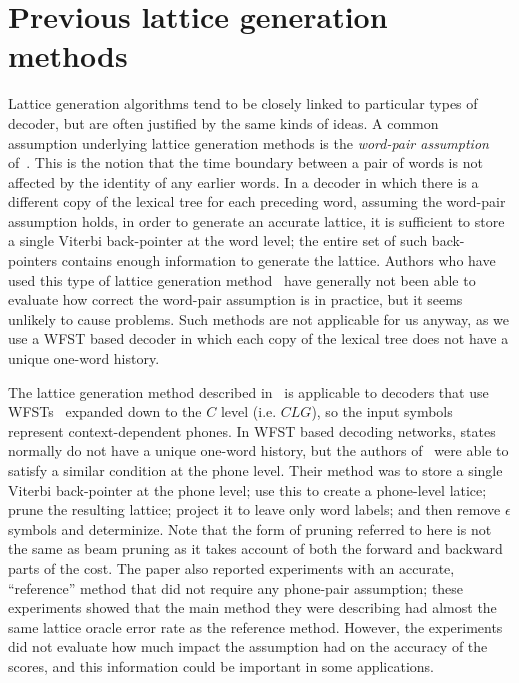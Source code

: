 \documentclass{article}
\begin{document}
\section{Previous lattice generation methods}
\label{sec:previous}

Lattice generation algorithms tend to be closely linked to particular types of decoder,
but are often justified by the same kinds of ideas.
A common assumption underlying lattice generation methods is the {\em word-pair assumption}
of~\cite{ney_word_graph}.  This is the notion that the time boundary between a pair of words
is not affected by the identity of any earlier words.  In a decoder in which there is
a different copy of the lexical tree for each preceding word, 
assuming the word-pair assumption holds, in order to generate an accurate lattice, it is
sufficient to store a single Viterbi back-pointer at the word level; the entire set of
such back-pointers contains enough information to generate the lattice.  Authors who have used
this type of lattice generation method~\cite{ney_word_graph,odell_thesis} have generally
not been able to evaluate how correct the word-pair assumption is in practice, but it seems
unlikely to cause problems.  Such methods are not applicable for us anyway, as we
use a WFST based decoder in which each copy of the lexical tree does not have a unique
one-word history.

The lattice generation method described in~\cite{efficient_general} 
is applicable to decoders that use WFSTs~\cite{wfst}
expanded down to the $C$ level (i.e. $CLG$), so the input symbols represent
context-dependent phones.  In WFST based decoding networks, states normally do
not have a unique one-word history, but the authors of~\cite{efficient_general}
were able to satisfy a similar condition at the phone level.  Their method was
to store a single Viterbi back-pointer at the phone level; use this to 
create a phone-level latice; prune the resulting
lattice; project it to leave only word labels; and then remove $\epsilon$
symbols and determinize.
Note that the form of pruning referred to here is not the same as beam pruning as
it takes account of both the forward and backward parts of the cost.
The paper also reported experiments with an accurate, ``reference'' method that did not require any
phone-pair assumption; these experiments showed that the main method they were describing
had almost the same lattice oracle error rate as the reference method.  However, the 
experiments did not evaluate how much impact the assumption had on the accuracy of the scores, 
and this information could be important in some applications.
\end{document}
